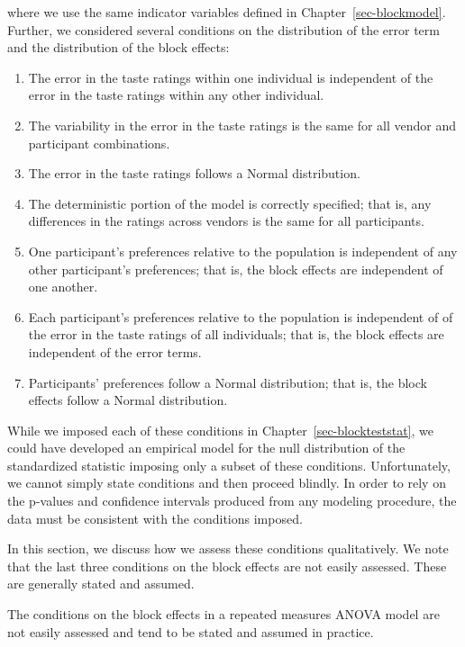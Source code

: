 \documentclass[
  letterpaper,
  DIV=11,
  numbers=noendperiod]{scrreprt}
\providecommand{\tightlist}{%
  \setlength{\itemsep}{0pt}\setlength{\parskip}{0pt}}\usepackage{longtable,booktabs,array}
\theoremstyle{definition}
\theoremstyle{definition}
\theoremstyle{plain}
\theoremstyle{remark}
\begin{document}
where we use the same indicator variables defined in
Chapter~\ref{sec-blockmodel}. Further, we considered several conditions
on the distribution of the error term and the distribution of the block
effects:

\begin{enumerate}
\def\labelenumi{\arabic{enumi}.}
\tightlist
\item
  The error in the taste ratings within one individual is independent of
  the error in the taste ratings within any other individual.
\item
  The variability in the error in the taste ratings is the same for all
  vendor and participant combinations.
\item
  The error in the taste ratings follows a Normal distribution.
\item
  The deterministic portion of the model is correctly specified; that
  is, any differences in the ratings across vendors is the same for all
  participants.
\item
  One participant's preferences relative to the population is
  independent of any other participant's preferences; that is, the block
  effects are independent of one another.
\item
  Each participant's preferences relative to the population is
  independent of of the error in the taste ratings of all individuals;
  that is, the block effects are independent of the error terms.
\item
  Participants' preferences follow a Normal distribution; that is, the
  block effects follow a Normal distribution.
\end{enumerate}

While we imposed each of these conditions in
Chapter~\ref{sec-blockteststat}, we could have developed an empirical
model for the null distribution of the standardized statistic imposing
only a subset of these conditions. Unfortunately, we cannot simply state
conditions and then proceed blindly. In order to rely on the p-values
and confidence intervals produced from any modeling procedure, the data
must be consistent with the conditions imposed.

In this section, we discuss how we assess these conditions
qualitatively. We note that the last three conditions on the block
effects are not easily assessed. These are generally stated and assumed.

\begin{tcolorbox}[enhanced jigsaw, colbacktitle=quarto-callout-warning-color!10!white, colback=white, left=2mm, title=\textcolor{quarto-callout-warning-color}{\faExclamationTriangle}\hspace{0.5em}{Warning}, toptitle=1mm, leftrule=.75mm, breakable, bottomrule=.15mm, arc=.35mm, rightrule=.15mm, toprule=.15mm, coltitle=black, opacityback=0, colframe=quarto-callout-warning-color-frame, opacitybacktitle=0.6, bottomtitle=1mm, titlerule=0mm]

The conditions on the block effects in a repeated measures ANOVA model
are not easily assessed and tend to be stated and assumed in practice.

\end{tcolorbox}
\end{document}
